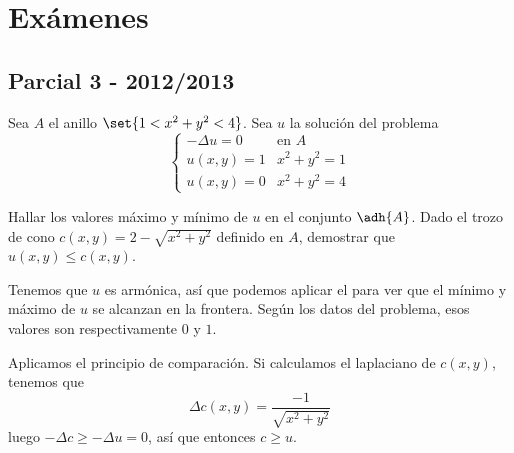 \section{Exámenes}

\subsection{Parcial 3 - 2012/2013}


\begin{problem}[1] Sea $A$ el anillo $\set{1 < x^2 + y^2 < 4}$. Sea $u$ la solución del problema
\[
\begin{cases}
	- Δ u = 0 & \text{en } A \\
	u(x,y) = 1 & x^2 + y^2 = 1 \\
	u(x,y) = 0 & x^2 + y^2 = 4
\end{cases}
\]

\ppart Hallar los valores máximo y mínimo de $u$ en el conjunto $\adh{A}$.
\ppart Dado el trozo de cono $c(x,y) = 2 - \sqrt{x^2 + y^2}$ definido en $A$, demostrar que $u(x,y) ≤ c(x,y)$.

\solution

\spart

Tenemos que $u$ es armónica, así que podemos aplicar el  para ver que el mínimo y máximo de $u$ se alcanzan en la frontera. Según los datos del problema, esos valores son respectivamente $0$ y $1$.

\spart

Aplicamos el principio de comparación. Si calculamos el laplaciano de $c(x,y)$, tenemos que \[ Δc(x,y) = \frac{-1}{\sqrt{x^2 + y^2}}\] luego $-Δc ≥ -Δu = 0$, así que entonces $c  ≥ u$.

\end{problem}


